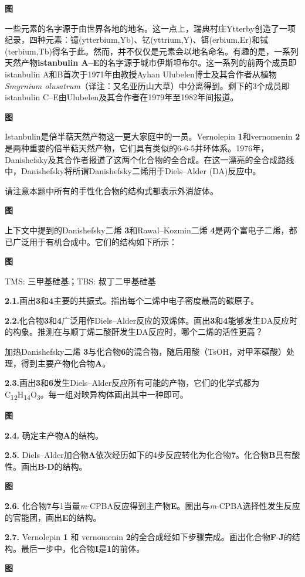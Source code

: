 \textbf{图}

一些元素的名字源于由世界各地的地名。这一点上，瑞典村庄Ytterby创造了一项纪录，四种元素：镱(ytterbium,Yb)、钇(yttrium,Y)、铒(erbium,Er)和铽(terbium,Tb)得名于此。然而，并不仅仅是元素会以地名命名。有趣的是，一系列天然产物\textbf{istanbulin A--E}的名字源于城市伊斯坦布尔。这一系列的前两个成员即istanbulin A和B首次于1971年由教授Ayhan Ulubelen博士及其合作者从植物\emph{Smyrnium olusatrum}（译注：又名亚历山大草）中分离得到。剩下的3个成员即istanbulin C--E由Ulubelen及其合作者在1979年至1982年间报道。

\textbf{图}

Istanbulin是倍半萜天然产物这一更大家庭中的一员。Vernolepin \textbf{1}和vernomenin \textbf{2}是两种重要的倍半萜天然产物，它们具有类似的6-6-5并环体系。1976年，Danishefsky及其合作者报道了这两个化合物的全合成。在这一漂亮的全合成路线中，Danishefsky将所谓Danishefsky二烯用于Diels--Alder (DA)反应中。

请注意本题中所有的手性化合物的结构式都表示外消旋体。

\textbf{图}

上下文中提到的Danishefsky二烯 \textbf{3}和Rawal--Kozmin二烯 \textbf{4}是两个富电子二烯，都已广泛用于有机合成中。它们的结构如下所示：

\textbf{图}

TMS: 三甲基硅基；TBS: 叔丁二甲基硅基

\noindent\textbf{2.1.}画出\textbf{3}和\textbf{4}主要的共振式。指出每个二烯中电子密度最高的碳原子。

\noindent\textbf{2.2.}化合物\textbf{3}和\textbf{4}广泛用作Diels--Alder反应的双烯体。画出\textbf{3}和\textbf{4}能够发生DA反应时的构象。推测在与顺丁烯二酸酐发生DA反应时，哪个二烯的活性更高？

加热Danishefsky二烯 \textbf{3}与化合物\textbf{6}的混合物，随后用酸（TsOH，对甲苯磺酸）处理，得到主要产物化合物\textbf{A}。

\noindent\textbf{2.3.}画出\textbf{3}和\textbf{6}发生Diels--Alder反应所有可能的产物，它们的化学式都为C\textsubscript{12}H\textsubscript{14}O\textsubscript{3}。每一组对映异构体画出其中一种即可。

\textbf{图}

\noindent\textbf{2.4.} 确定主产物\textbf{A}的结构。

\noindent\textbf{2.5.} Diels--Alder加合物\textbf{A}依次经历如下的4步反应转化为化合物\textbf{7}。化合物\textbf{B}具有酸性。画出\textbf{B}-\textbf{D}的结构。

\textbf{图}

\noindent\textbf{2.6.} 化合物\textbf{7}与1当量\emph{m}-CPBA反应得到主产物\textbf{E}。圈出与\emph{m}-CPBA选择性发生反应的官能团，画出\textbf{E}的结构。

\noindent\textbf{2.7.} Vernolepin \textbf{1} 和 vernomenin \textbf{2}的全合成经如下步骤完成。画出化合物\textbf{F}-\textbf{J}的结构。最后一步中，化合物\textbf{I}是\textbf{1}的前体。

\textbf{图}